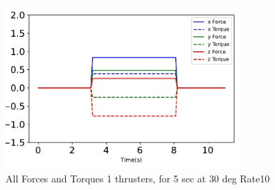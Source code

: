 \begin{figure}[htbp]\centerline{\includegraphics[width=0.8\textwidth]{AutoTeX/1Thrusters_5s_30deg_Loc0_Rate10}}\caption{All Forces and Torques 1 thrusters, for 5 sec at 30 deg Rate10}\label{fig:1Thrusters_5s_30deg_Loc0_Rate10}\end{figure}